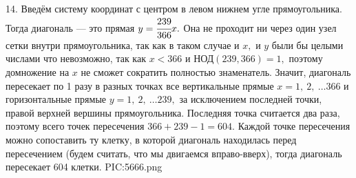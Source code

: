 14. Введём систему координат с центром в левом нижнем угле прямоугольника. Тогда диагональ --- это прямая $y=\cfrac{239}{366}x.$ Она не проходит ни через один узел сетки внутри прямоугольника, так как в таком случае и $x,$ и $y$ были бы целыми числами что невозможно, так как $x<366$ и $\text{НОД}(239,366)=1,$ поэтому домножение на $x$ не сможет сократить полностью знаменатель. Значит, диагональ пересекает по 1 разу в разных точках все вертикальные прямые $x=1,\ 2,\ \ldots 366$ и горизонтальные прямые $y=1,\ 2,\ \ldots 239,$ за исключением последней точки, правой верхней вершины прямоугольника. Последняя точка считается два раза, поэтому всего точек пересечения $366+239-1=604.$ Каждой точке пересечения можно сопоставить ту клетку, в которой диагональ находилась перед пересечением (будем считать, что мы двигаемся вправо-вверх), тогда диагональ пересекает 604 клетки.
{{PIC:5666.png}}\\

